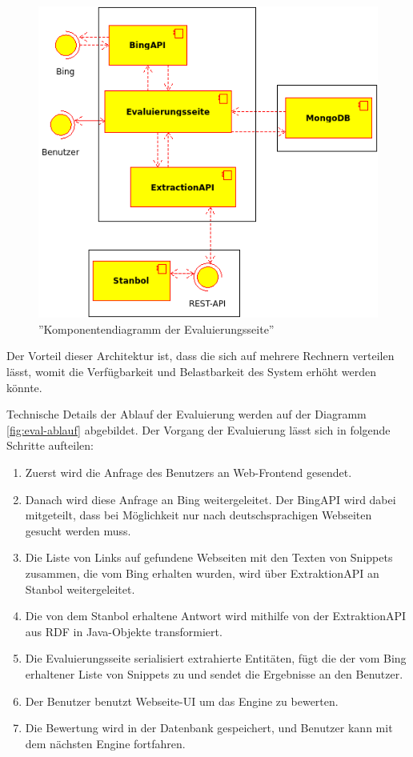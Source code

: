 \begin{figure}
\centering
\includegraphics[width=1\textwidth]{Bilder/evaluation_components.png}
\caption{''Komponentendiagramm der Evaluierungsseite''}
\label{fig:evalcomponents}
\end{figure}
Der Vorteil dieser Architektur ist, dass die sich auf mehrere Rechnern verteilen lässt, womit die Verfügbarkeit und Belastbarkeit des System erhöht werden könnte.

Technische Details der Ablauf der Evaluierung werden auf der Diagramm \ref{fig:eval-ablauf} abgebildet. Der Vorgang der Evaluierung lässt sich in folgende Schritte aufteilen:
\begin{enumerate}
\item Zuerst wird die Anfrage des Benutzers an Web-Frontend gesendet.
\item Danach wird diese Anfrage an Bing weitergeleitet. Der BingAPI wird dabei mitgeteilt, dass bei Möglichkeit nur nach deutschsprachigen Webseiten gesucht werden muss.
\item Die Liste von Links auf gefundene Webseiten mit den Texten von Snippets zusammen, die vom Bing erhalten wurden, wird über ExtraktionAPI an Stanbol weitergeleitet.
\item Die von dem Stanbol erhaltene Antwort wird mithilfe von der ExtraktionAPI aus RDF in Java-Objekte transformiert.
\item Die Evaluierungsseite serialisiert extrahierte Entitäten, fügt die der vom Bing erhaltener Liste von Snippets zu und sendet die Ergebnisse an den Benutzer.
\item Der Benutzer benutzt Webseite-UI um das Engine zu bewerten.
\item Die Bewertung wird in der Datenbank gespeichert, und Benutzer kann mit dem nächsten Engine fortfahren.
\end{enumerate}

